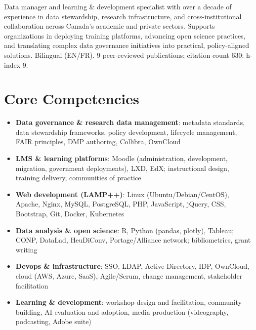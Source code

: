 \documentclass[11pt,a4paper,sans]{moderncv}
\begin{document}
\makecvtitle


\vspace{6pt}
\small{Data manager and learning \& development specialist with over a decade of experience in data stewardship, research infrastructure, and cross-institutional collaboration across Canada's academic and private sectors. Supports organizations in deploying training platforms, advancing open science practices, and translating complex data governance initiatives into practical, policy-aligned solutions. Bilingual (EN/FR). 9 peer-reviewed publications; citation count 630; h-index 9.}


\section{Core Competencies}
\vspace{1pt}
\begin{itemize}

\item \textbf{Data governance \& research data management}: metadata standards, data stewardship frameworks, policy development, lifecycle management, FAIR principles, DMP authoring, Collibra, OwnCloud

\item \textbf{LMS \& learning platforms}: Moodle (administration, development, migration, government deployments), LXD, EdX; instructional design, training delivery, communities of practice

\item \textbf{Web development (LAMP++)}: Linux (Ubuntu/Debian/CentOS), Apache, Nginx, MySQL, PostgreSQL, PHP, JavaScript, jQuery, CSS, Bootstrap, Git, Docker, Kubernetes

\item \textbf{Data analysis \& open science}: R, Python (pandas, plotly), Tableau; CONP, DataLad, HeuDiConv, Portage/Alliance network; bibliometrics, grant writing

\item \textbf{Devops \& infrastructure}: SSO, LDAP, Active Directory, IDP, OwnCloud, cloud (AWS, Azure, SaaS), Agile/Scrum, change management, stakeholder facilitation

\item \textbf{Learning \& development}: workshop design and facilitation, community building, AI evaluation and adoption, media production (videography, podcasting, Adobe suite)

\end{itemize}
\end{document}
